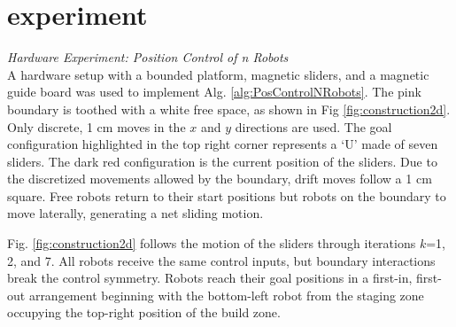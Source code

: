 
\section{experiment}\label{sec:expResults}

\emph{Hardware Experiment: Position Control of n Robots}\\
A hardware setup with a bounded platform, magnetic sliders, and a magnetic guide board was used to implement  Alg. \ref{alg:PosControlNRobots}. 
  The pink boundary is toothed with a white free space, as shown in Fig \ref{fig:construction2d}.
    Only discrete, 1 cm moves in the $x$ and $y$ directions are used. The goal configuration highlighted in the top right corner represents a `U' made of seven sliders. The dark red configuration is the current position of the sliders. 
Due to the discretized movements allowed by the boundary, drift moves follow a 1 cm square.  Free robots return to their start positions but robots on the boundary to move laterally, generating a net sliding motion.

Fig. \ref{fig:construction2d} follows the motion of the sliders through iterations  $k$=1, 2, and 7. All robots receive the same control inputs, but boundary interactions break the control symmetry.  Robots reach their goal positions in a first-in, first-out arrangement beginning with the bottom-left robot from the staging zone occupying the top-right position of the build zone.

